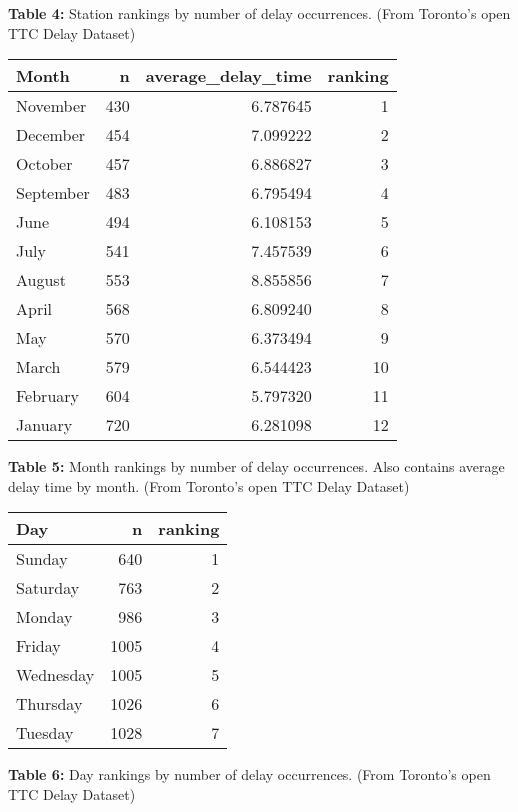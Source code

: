\documentclass[
]{article}
\begin{document}
\textbf{Table 4:} Station rankings by number of delay occurrences. (From
Toronto's open TTC Delay Dataset)

\begin{table}[H]
\centering
\begin{tabular}{l|r|r|r}
\hline
Month & n & average\_delay\_time & ranking\\
\hline
November & 430 & 6.787645 & 1\\
\hline
December & 454 & 7.099222 & 2\\
\hline
October & 457 & 6.886827 & 3\\
\hline
September & 483 & 6.795494 & 4\\
\hline
June & 494 & 6.108153 & 5\\
\hline
July & 541 & 7.457539 & 6\\
\hline
August & 553 & 8.855856 & 7\\
\hline
April & 568 & 6.809240 & 8\\
\hline
May & 570 & 6.373494 & 9\\
\hline
March & 579 & 6.544423 & 10\\
\hline
February & 604 & 5.797320 & 11\\
\hline
January & 720 & 6.281098 & 12\\
\hline
\end{tabular}
\end{table}

\textbf{Table 5:} Month rankings by number of delay occurrences. Also
contains average delay time by month. (From Toronto's open TTC Delay
Dataset)

\begin{table}[H]
\centering
\begin{tabular}{l|r|r}
\hline
Day & n & ranking\\
\hline
Sunday & 640 & 1\\
\hline
Saturday & 763 & 2\\
\hline
Monday & 986 & 3\\
\hline
Friday & 1005 & 4\\
\hline
Wednesday & 1005 & 5\\
\hline
Thursday & 1026 & 6\\
\hline
Tuesday & 1028 & 7\\
\hline
\end{tabular}
\end{table}

\textbf{Table 6:} Day rankings by number of delay occurrences. (From
Toronto's open TTC Delay Dataset)
\end{document}
